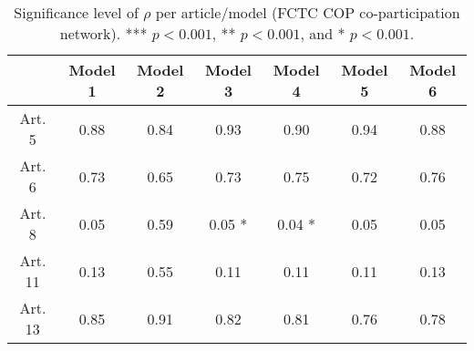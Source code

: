 \begin{table}[ht]
\centering
\begin{tabular}{ccccccc}
  \toprule
 & Model 1 & Model 2 & Model 3 & Model 4 & Model 5 & Model 6 \\ 
  \midrule
Art. 5 & 0.88   & 0.84   & 0.93   & 0.90   & 0.94   & 0.88   \\ 
   \midrule
Art. 6 & 0.73   & 0.65   & 0.73   & 0.75   & 0.72   & 0.76   \\ 
   \midrule
Art. 8 & 0.05   & 0.59   & 0.05 * & 0.04 * & 0.05   & 0.05   \\ 
   \midrule
Art. 11 & 0.13   & 0.55   & 0.11   & 0.11   & 0.11   & 0.13   \\ 
   \midrule
Art. 13 & 0.85   & 0.91   & 0.82   & 0.81   & 0.76   & 0.78   \\ 
   \bottomrule
\end{tabular}
\caption{Significance level of $\rho$ per article/model (FCTC COP co-participation network). *** $p < 0.001$, ** $p < 0.001$, and * $p < 0.001$.} 
\end{table}

